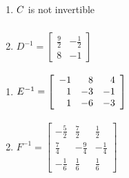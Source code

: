 \begin{multicols}{2} 
\begin{enumerate}
\setcounter{enumi}{\value{HW}}

\item $C \vphantom{\left[ \begin{array}{rr} \frac{9}{2} & -\frac{1}{2} \\ 8 & -1 \end{array} \right]}$ is not invertible
\item $D^{-1} = \left[ \begin{array}{rr} \frac{9}{2} & -\frac{1}{2} \\ 8 & -1 \end{array} \right]$

\setcounter{HW}{\value{enumi}}
\end{enumerate}
\end{multicols}

\begin{multicols}{2} 
\begin{enumerate}
\setcounter{enumi}{\value{HW}}

\item $E^{-1} = \left[ \begin{array}{rrr} -1 & 8 & 4 \\ 1 & -3 & -1 \\ 1 & -6 & -3 \end{array} \right] \vphantom{\left[ \begin{array}{rrr} -\frac{5}{2} & \frac{7}{2} & \frac{1}{2} \\[3pt] \frac{7}{4} & -\frac{9}{4} & -\frac{1}{4} \\[3pt] -\frac{1}{6} & \frac{1}{6} & \frac{1}{6} \end{array} \right]}$
\item $F^{-1} = \left[ \begin{array}{rrr} -\frac{5}{2} & \frac{7}{2} & \frac{1}{2} \\[3pt] \frac{7}{4} & -\frac{9}{4} & -\frac{1}{4} \\[3pt] -\frac{1}{6} & \frac{1}{6} & \frac{1}{6} \end{array} \right]$

\setcounter{HW}{\value{enumi}}
\end{enumerate}
\end{multicols}

